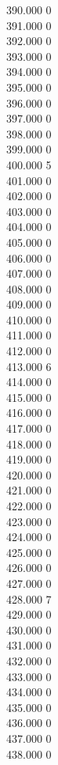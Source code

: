 { 390.000	0 \\
 391.000	0 \\
 392.000	0 \\
 393.000	0 \\
 394.000	0 \\
 395.000	0 \\
 396.000	0 \\
 397.000	0 \\
 398.000	0 \\
 399.000	0 \\
 400.000	5 \\
 401.000	0 \\
 402.000	0 \\
 403.000	0 \\
 404.000	0 \\
 405.000	0 \\
 406.000	0 \\
 407.000	0 \\
 408.000	0 \\
 409.000	0 \\
 410.000	0 \\
 411.000	0 \\
 412.000	0 \\
 413.000	6 \\
 414.000	0 \\
 415.000	0 \\
 416.000	0 \\
 417.000	0 \\
 418.000	0 \\
 419.000	0 \\
 420.000	0 \\
 421.000	0 \\
 422.000	0 \\
 423.000	0 \\
 424.000	0 \\
 425.000	0 \\
 426.000	0 \\
 427.000	0 \\
 428.000	7 \\
 429.000	0 \\
 430.000	0 \\
 431.000	0 \\
 432.000	0 \\
 433.000	0 \\
 434.000	0 \\
 435.000	0 \\
 436.000	0 \\
 437.000	0 \\
 438.000	0 \\
}
